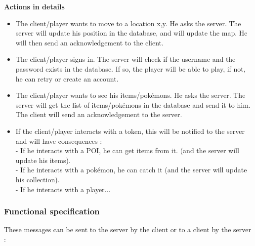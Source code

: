 \documentclass[a4paper,09pt]{article}
\begin{document}
\textbf{Actions in details}
\begin{itemize}
\item The client/player wants to move to a location x,y. He asks the server.
  The server will update his position in the database, and will update the
  map. He will then send an acknowledgement to the client.
\item The client/player signs in. The server will check if the username and
  the password exists in the database. If so, the player will be able to play,
  if not, he can retry or create an account.
\item The client/player wants to see his items/pokémons. He asks the server.
  The server will get the list of items/pokémons in the database and send it
  to him. The client will send an acknowledgement to the server.
\item If the client/player interacts with a token, this will be notified to
  the server and will have consequences :\\
  - If he interacts with a POI, he can get items from it. (and the server will
  update his items).\\
  - If he interacts with a pokémon, he can catch it (and the server
  will update his collection).\\
- If he interacts with a player...\\
\end{itemize}

\subsubsection{Functional specification}

These messages can be sent to the server by the client or to a client by the server :
\end{document}
